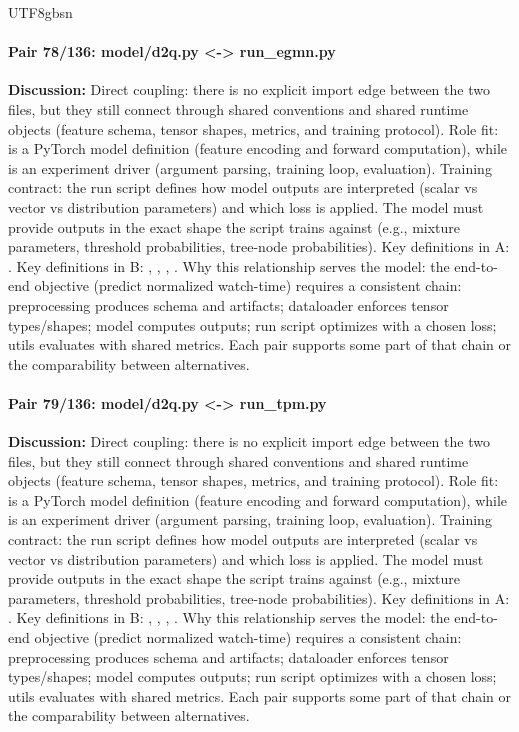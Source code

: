 \documentclass[11pt]{article}
\begin{document}
\begin{CJK*}{UTF8}{gbsn}
\paragraph{Pair 78/136: model/d2q.py <-> run\_egmn.py}
\textbf{Discussion:} Direct coupling: there is no explicit import edge between the two files, but they still connect through shared conventions and shared runtime objects (feature schema, tensor shapes, metrics, and training protocol). Role fit: \texttt{} is a PyTorch model definition (feature encoding and forward computation), while \texttt{} is an experiment driver (argument parsing, training loop, evaluation). Training contract: the run script defines how model outputs are interpreted (scalar vs vector vs distribution parameters) and which loss is applied. The model must provide outputs in the exact shape the script trains against (e.g., mixture parameters, threshold probabilities, tree-node probabilities). Key definitions in A: \texttt{}. Key definitions in B: \texttt{}, \texttt{}, \texttt{}, \texttt{}. Why this relationship serves the model: the end-to-end objective (predict normalized watch-time) requires a consistent chain: preprocessing produces schema and artifacts; dataloader enforces tensor types/shapes; model computes outputs; run script optimizes with a chosen loss; utils evaluates with shared metrics. Each pair supports some part of that chain or the comparability between alternatives.

\paragraph{Pair 79/136: model/d2q.py <-> run\_tpm.py}
\textbf{Discussion:} Direct coupling: there is no explicit import edge between the two files, but they still connect through shared conventions and shared runtime objects (feature schema, tensor shapes, metrics, and training protocol). Role fit: \texttt{} is a PyTorch model definition (feature encoding and forward computation), while \texttt{} is an experiment driver (argument parsing, training loop, evaluation). Training contract: the run script defines how model outputs are interpreted (scalar vs vector vs distribution parameters) and which loss is applied. The model must provide outputs in the exact shape the script trains against (e.g., mixture parameters, threshold probabilities, tree-node probabilities). Key definitions in A: \texttt{}. Key definitions in B: \texttt{}, \texttt{}, \texttt{}, \texttt{}. Why this relationship serves the model: the end-to-end objective (predict normalized watch-time) requires a consistent chain: preprocessing produces schema and artifacts; dataloader enforces tensor types/shapes; model computes outputs; run script optimizes with a chosen loss; utils evaluates with shared metrics. Each pair supports some part of that chain or the comparability between alternatives.


\end{CJK*}
\end{document}
